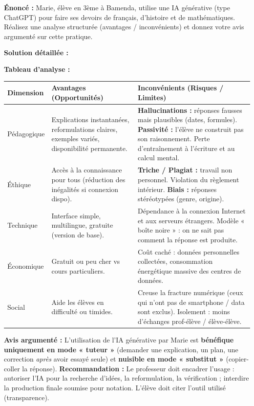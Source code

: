 \documentclass[11pt]{article}
\begin{document}
\begin{exoresolu}
\textbf{Énoncé :} Marie, élève en 3ème à Bamenda, utilise une IA générative (type ChatGPT) pour faire ses devoirs de français, d'histoire et de mathématiques. Réalisez une analyse structurée (avantages / inconvénients) et donnez votre avis argumenté sur cette pratique.

\tcblower
\textbf{Solution détaillée :}

\textbf{Tableau d'analyse :}

\begin{center}
\begin{tabularx}{\linewidth}{|l|X|X|}
\hline
\rowcolor{popblueL}
\textbf{Dimension} & \textbf{Avantages (Opportunités)} & \textbf{Inconvénients (Risques / Limites)} \\
\hline
Pédagogique & Explications instantanées, reformulations claires, exemples variés, disponibilité permanente. & \textbf{Hallucinations :} réponses fausses mais plausibles (dates, formules). \textbf{Passivité :} l'élève ne construit pas son raisonnement. Perte d'entraînement à l'écriture et au calcul mental. \\
\hline
Éthique & Accès à la connaissance pour tous (réduction des inégalités si connexion dispo). & \textbf{Triche / Plagiat :} travail non personnel. Violation du règlement intérieur. \textbf{Biais :} réponses stéréotypées (genre, origine). \\
\hline
Technique & Interface simple, multilingue, gratuite (version de base). & Dépendance à la connexion Internet et aux serveurs étrangers. Modèle « boîte noire » : on ne sait pas comment la réponse est produite. \\
\hline
Économique & Gratuit ou peu cher vs cours particuliers. & Coût caché : données personnelles collectées, consommation énergétique massive des centres de données. \\
\hline
Social & Aide les élèves en difficulté ou timides. & Creuse la fracture numérique (ceux qui n'ont pas de smartphone / data sont exclus). Isolement : moins d'échanges prof-élève / élève-élève. \\
\hline
\end{tabularx}
\end{center}

\textbf{Avis argumenté :}
L'utilisation de l'IA générative par Marie est \textbf{bénéfique uniquement en mode « tuteur »} (demander une explication, un plan, une correction \emph{après} avoir essayé seule) et \textbf{nuisible en mode « substitut »} (copier-coller la réponse).
\textbf{Recommandation :} Le professeur doit encadrer l'usage : autoriser l'IA pour la recherche d'idées, la reformulation, la vérification ; interdire la production finale soumise pour notation. L'élève doit citer l'outil utilisé (transparence).
\end{exoresolu}
\end{document}
